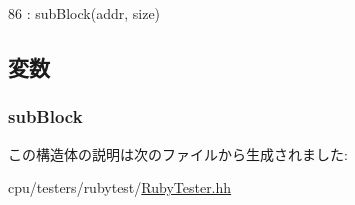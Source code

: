 \begin{DoxyCode}
86 : subBlock(addr, size) {}
\end{DoxyCode}


\subsection{変数}
\hypertarget{structRubyTester_1_1SenderState_a81bfae9b069d61b34b007fa18c34a8d1}{
\subsubsection[{subBlock}]{ {\bf subBlock}}}
\label{structRubyTester_1_1SenderState_a81bfae9b069d61b34b007fa18c34a8d1}


この構造体の説明は次のファイルから生成されました:\begin{DoxyCompactItemize}
\item 
cpu/testers/rubytest/\hyperlink{RubyTester_8hh}{RubyTester.hh}\end{DoxyCompactItemize}
